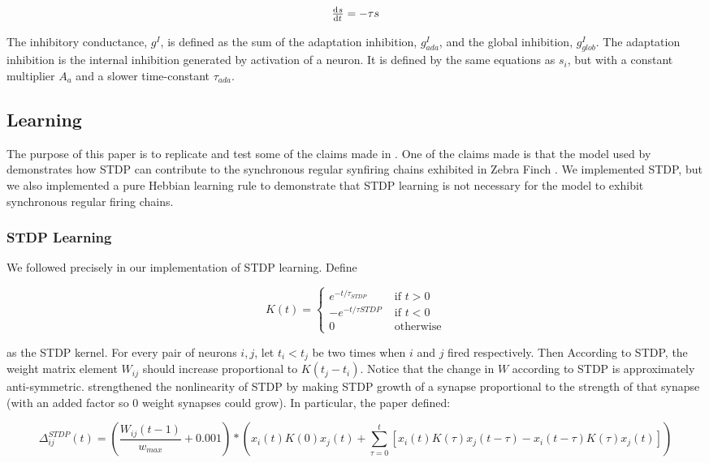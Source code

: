 \[\od{s}{t} = -\tau s\]

The inhibitory conductance, \(g^I\), is defined as the sum of the adaptation inhibition, \(g^I_{ada}\), and the global inhibition, \(g^I_{glob}\). The adaptation inhibition is the internal inhibition generated by activation of a neuron. It is defined by the same equations as \(s_i\), but with a constant multiplier \(A_a\) and a slower time-constant \(\tau_{ada}\).

\subsection{Learning}

The purpose of this paper is to replicate and test some of the claims made in \cite{Fiete}. One of the claims made is that the model used by \cite{Fiete} demonstrates how STDP can contribute to the synchronous regular synfiring chains exhibited in Zebra Finch \cite{Hahnloser2002}. We implemented STDP, but we also implemented a pure Hebbian learning rule to demonstrate that STDP learning is not necessary for the model to exhibit synchronous regular firing chains.

\subsubsection{STDP Learning}

We followed \cite{Fiete} precisely in our implementation of STDP learning. Define

\[K(t) = 
\begin{cases}
e^{-t/\tau_{STDP}} &\text{ if } t > 0\\
-e^{-t/\tau{STDP}} &\text{ if } t < 0\\
0 &\text{ otherwise}
\end{cases}
\]

as the STDP kernel. For every pair of neurons \(i,j\), let \(t_i < t_j\) be two times when \(i\) and \(j\) fired respectively. Then According to STDP, the weight matrix element \(W_{ij}\) should increase proportional to \(K(t_j - t_i)\). Notice that the change in \(W\) according to STDP is approximately anti-symmetric. \cite{Fiete} strengthened the nonlinearity of STDP by making STDP growth of a synapse proportional to the strength of that synapse (with an added factor so 0 weight synapses could grow). In particular, the paper defined:

\begin{equation}
\Delta^{STDP}_{ij}(t) = \left(\frac{W_{ij}(t-1)}{w_{max}} + 0.001\right)*\left(x_i(t)K(0)x_j(t) + \sum_{\tau = 0}^t  [x_i(t)K(\tau)x_j(t -\tau) - x_i(t - \tau)K(\tau)x_j(t)]\right)
\label{STDP}
\end{equation}

